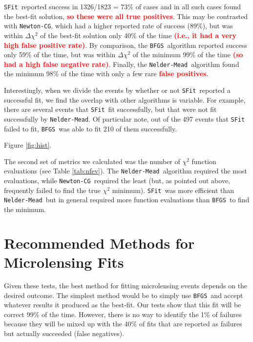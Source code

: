 \documentclass[preprint]{aastex631}
\newcommand{\HL}[1]{\textcolor{red}{\bf#1}}
\newcommand{\neldarmead}{\texttt{Nelder-Mead}}
\newcommand{\newtoncg}{\texttt{Newton-CG}}
\newcommand{\bfgs}{\texttt{BFGS}}
\newcommand{\sfit}{\texttt{SFit}}
\begin{document}
\sfit\, reported success in 1326/1823 = 73\% of cases and in all such cases found the best-fit solution, \HL{so these were all true positives}. This may be contrasted with \newtoncg, which had a higher reported rate of success (89\%), but was within $\Delta\chi^2$ of the best-fit solution only 40\% of the time \HL{(i.e., it had a very high false positive rate)}. 
By comparison, the \bfgs\, algorithm reported success only 59\% of the time, but was within $\Delta\chi^2$ of the minimum 99\% of the time \HL{(so had a high false negative rate)}. Finally, the \neldarmead\, algorithm found the minimum 98\% of the time with only a few rare \HL{false positives}.

Interestingly, when we divide the events by whether or not \sfit\, reported a successful fit, we find the overlap with other algorithms is variable. For example, there are several events that \sfit\, fit successfully, but that were not fit successfully by \neldarmead. Of particular note, out of the 497 events that \sfit\, failed to fit, \bfgs\, was able to fit 210 of them successfully.

Figure \ref{fig:hist}.

The second set of metrics we calculated was the number of $\chi^2$ function evaluations (see Table \ref{tab:nfev}). The \neldarmead\, algorithm required the most evaluations, while \newtoncg\, required the least (but, as pointed out above, frequently failed to find the true $\chi^2$ minimum). \sfit\, was more efficient than \neldarmead\, but in general required more function evaluations than \bfgs\, to find the minimum.

{\section{Recommended Methods for Microlensing Fits}
\label{sec:recommendations}}

Given these tests, the best method for fitting microlensing events depends on the desired outcome. The simplest method would be to simply use \bfgs\, and accept whatever results it produced as the best-fit. Our tests show that this fit will be correct 99\% of the time. However, there is no way to identify the 1\% of failures because they will be mixed up with the 40\% of fits that are reported as failures but actually succeeded (false negatives).
\end{document}
